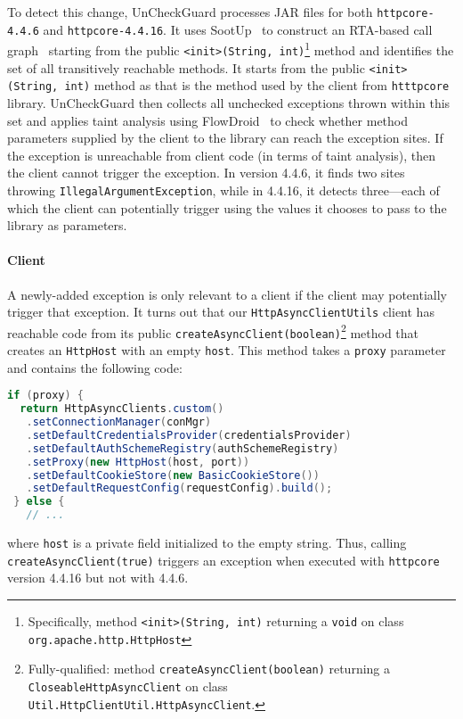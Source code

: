 To detect this change, UnCheckGuard processes JAR files for both \texttt{httpcore-4.4.6} and \texttt{httpcore-4.4.16}. It uses SootUp~\cite{Karakaya24:_sootup} to construct an RTA-based call graph~\cite{bacon96:_fast_static_analy_c_virtual_funct_calls} starting from the public \texttt{<init>(String, int)}\footnote{Specifically, method \texttt{<init>(String, int)} returning a \texttt{void} on class \texttt{org.apache.http.HttpHost}} method and identifies the set of all transitively reachable methods. It starts from the public \texttt{<init>(String, int)} method as that is the method used by the client from \texttt{htttpcore} library. UnCheckGuard then collects all unchecked exceptions thrown within this set and applies taint analysis using FlowDroid~\cite{Arzt14:_flowdroid} to check whether method parameters supplied by the client to the library can reach the exception sites. If the exception is unreachable from client code (in terms of taint analysis), then the client cannot trigger the exception. In version 4.4.6, it finds two sites throwing \texttt{IllegalArgumentException}, while in 4.4.16, it detects three—each of which the client can potentially trigger using the values it chooses to pass to the library as parameters.

\paragraph{Client} 
A newly-added exception is only relevant to a client if the client may
potentially trigger that exception.  It turns out that
our \texttt{HttpAsyncClientUtils} client has reachable code from its public \texttt{createAsyncClient(boolean)}\footnote{Fully-qualified: method \texttt{createAsyncClient(boolean)} returning a \texttt{CloseableHttpAsyncClient} on class \texttt{Util.HttpClientUtil.HttpAsyncClient}.} method
that creates an \texttt{HttpHost} with an empty \texttt{host}. This
method takes a \texttt{proxy}
parameter and contains the following code:
\begin{lstlisting}[language=Java,basicstyle=\scriptsize\ttfamily]
 if (proxy) {
  return HttpAsyncClients.custom()
   .setConnectionManager(conMgr)
   .setDefaultCredentialsProvider(credentialsProvider)
   .setDefaultAuthSchemeRegistry(authSchemeRegistry)
   .setProxy(new HttpHost(host, port))
   .setDefaultCookieStore(new BasicCookieStore())
   .setDefaultRequestConfig(requestConfig).build();
 } else {
   // ...
\end{lstlisting}
where \texttt{host} is a private field initialized to the empty string.
Thus, calling \texttt{createAsyncClient(true)} triggers an exception when executed with
\texttt{httpcore} version 4.4.16 but not with 4.4.6.

